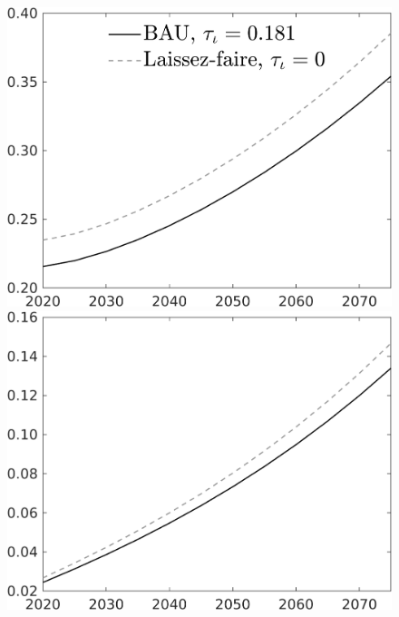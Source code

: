 \documentclass[12pt]{article}
\begin{document}
\begin{figure}[h!!]
\begin{minipage}[]{0.32\textwidth}
	\end{minipage}	
	\begin{minipage}[]{0.32\textwidth}
		\includegraphics[width=1\textwidth]{../../codding_model/own_basedOnFried/optimalPol_010922_revision/figures/all_13Sept22/CompTaul_Equlab_LFBAU_Reg0_F_spillover0_nsk0_xgr0_knspil0_sep1_countec0_GovRev0_etaa0.79_lgd1.png}
	\end{minipage}	
	\begin{minipage}[]{0.32\textwidth}
		\includegraphics[width=1\textwidth]{../../codding_model/own_basedOnFried/optimalPol_010922_revision/figures/all_13Sept22/CompTaul_Equlab_LFBAU_Reg0_G_spillover0_nsk0_xgr0_knspil0_sep1_countec0_GovRev0_etaa0.79_lgd0.png}

\end{minipage}
\end{figure}
\end{document}
